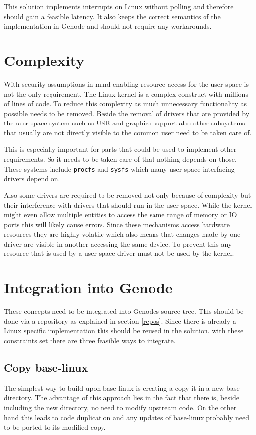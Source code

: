 \documentclass[
a4paper,
12pt,
notitlepage,
parskip=half,
DIV=11,
]{scrbook}
\begin{document}
		This solution implements interrupts on Linux without polling and therefore should gain a feasible latency.
		It also keeps the correct semantics of the implementation in Genode and should not require any workarounds.
		
		\section{Complexity}
		
		With security assumptions in mind enabling resource access for the user space is not the only requirement.
		The Linux kernel is a complex construct with millions of lines of code.
		To reduce this complexity as much unnecessary functionality as possible needs to be removed.
		Beside the removal of drivers that are provided by the user space system such as USB and graphics support also other subsystems that usually are not directly visible to the common user need to be taken care of.
		
		This is especially important for parts that could be used to implement other requirements.
		So it needs to be taken care of that nothing depends on those.
		These systems include \texttt{procfs} and \texttt{sysfs} which many user space interfacing drivers depend on. \citep{sysfs} \citep{procfs}
		
		Also some drivers are required to be removed not only because of complexity but their interference with drivers that should run in the user space.
		While the kernel might even allow multiple entities to access the same range of memory or IO ports this will likely cause errors.
		Since these mechanisms access hardware resources they are highly volatile which also means that changes made by one driver are visible in another accessing the same device.
		To prevent this any resource that is used by a user space driver must not be used by the kernel.
		
		\section{Integration into Genode}
		
		These concepts need to be integrated into Genodes source tree.
		This should be done via a repository as explained in section \ref{repos}.
		Since there is already a Linux specific implementation this should be reused in the solution.
		with these constraints set there are three feasible ways to integrate.
		
		\subsection{Copy base-linux}
		The simplest way to build upon base-linux is creating a copy it in a new base directory.
		The advantage of this approach lies in the fact that there is, beside including the new directory, no need to modify upstream code.
		On the other hand this leads to code duplication and any updates of base-linux probably need to be ported to its modified copy.
		
\end{document}
